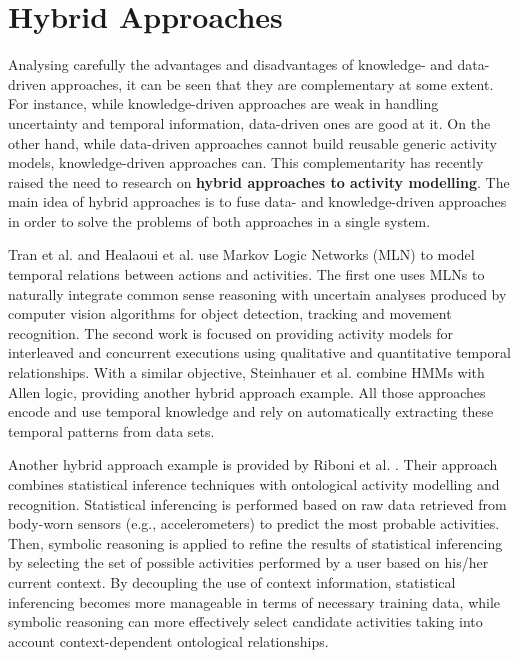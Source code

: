 \section{Hybrid Approaches}
\label{sec:soa:hybrid}


Analysing carefully the advantages and disadvantages of knowledge- and data-driven approaches, it can be seen that they are complementary at some extent. For instance, while knowledge-driven approaches are weak in handling uncertainty and temporal information, data-driven ones are good at it. On the other hand, while data-driven approaches cannot build reusable generic activity models, knowledge-driven approaches can. This complementarity has recently raised the need to research on \textbf{hybrid approaches to activity modelling}. The main idea of hybrid approaches is to fuse data- and knowledge-driven approaches in order to solve the problems of both approaches in a single system.

Tran et al. \cite{Tran2008} and Healaoui et al. \cite{Helaoui2011a} use Markov Logic Networks (MLN) to model temporal relations between actions and activities. The first one uses MLNs to naturally integrate common sense reasoning with uncertain analyses produced by computer vision algorithms for object detection, tracking and movement recognition. The second work is focused on providing activity models for interleaved and concurrent executions using qualitative and quantitative temporal relationships. With a similar objective, Steinhauer et al. \cite{Steinhauer2010} combine HMMs with Allen logic, providing another hybrid approach example. All those approaches encode and use temporal knowledge and rely on automatically extracting these temporal patterns from data sets.

Another hybrid approach example is provided by Riboni et al. \cite{Riboni2011a}. Their approach combines statistical inference techniques with ontological activity modelling and recognition. Statistical inferencing is performed based on raw data retrieved from body-worn sensors (e.g., accelerometers) to predict the most probable activities. Then, symbolic reasoning is applied to refine the results of statistical inferencing by selecting the set of possible activities performed by a user based on his/her current context. By decoupling the use of context information, statistical inferencing becomes more manageable in terms of necessary training data, while symbolic reasoning can more effectively select candidate activities taking into account context-dependent ontological relationships.

